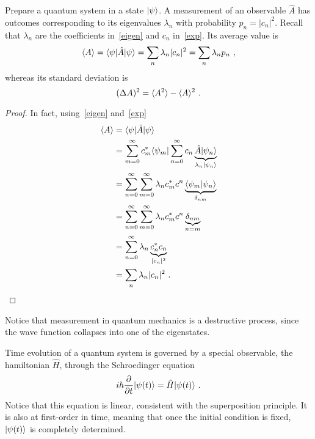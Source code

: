    Prepare a quantum system in a state $\vert\psi\rangle$. A measurement of an observable $\hat A$ has outcomes corresponding to its eigenvalues $\lambda_n$ with probability $p_n = |c_n|^2$. Recall that $\lambda_n$ are the coefficients in~\eqref{eigen} and $c_n$ in~\eqref{exp}. Its average value is 
    \begin{equation}\label{avval}
        \langle A\rangle = \langle\psi\vert \hat A \vert\psi\rangle = \sum_{n} \lambda_n |c_n|^2 = \sum_{n} \lambda_n p_n ~,
    \end{equation}
    whereas its standard deviation is 
    \begin{equation*}
        (\Delta A)^2 = \langle A^2\rangle - \langle A\rangle^2 ~.
    \end{equation*}
    \begin{proof}
        In fact, using~\eqref{eigen} and~\eqref{exp}
        \begin{equation*}
        \begin{aligned}
            \langle A\rangle & = \langle\psi\vert \hat A \vert\psi\rangle \\ & = \sum_{m=0}^{\infty} c_m^* \langle\psi_m\vert \sum_{n=0}^{\infty} c_n \underbrace{\hat A \vert\psi_n\rangle}_{\lambda_n \vert\psi_n\rangle} \\ & = \sum_{n=0}^{\infty} \sum_{m=0}^{\infty} \lambda_n c^*_m c^n \underbrace{\langle\psi_m\vert\psi_n\rangle}_{\delta_{nm}} \\ & = \sum_{n=0}^{\infty} \sum_{m=0}^{\infty} \lambda_n c^*_m c^n \underbrace{\delta_{nm}}_{n=m} \\ & = \sum_{n=0}^{\infty} \lambda_n \underbrace{c^*_n c_n}_{|c_n|^2} \\ & = \sum_{n} \lambda_n |c_n|^2 ~.
        \end{aligned}
        \end{equation*}
    \end{proof}

    Notice that measurement in quantum mechanics is a destructive process, since the wave function collapses into one of the eigenstates. 

    Time evolution of a quantum system is governed by a special observable, the hamiltonian $\hat H$, through the Schroedinger equation
    \begin{equation*}
        i \hbar \frac{\partial}{\partial t} \vert\psi(t)\rangle = \hat H \vert\psi(t)\rangle ~.
    \end{equation*}
    Notice that this equation is linear, consistent with the superposition principle. It is also at first-order in time, meaning that once the initial condition is fixed, $\vert\psi(t)\rangle$ is completely determined.
    
